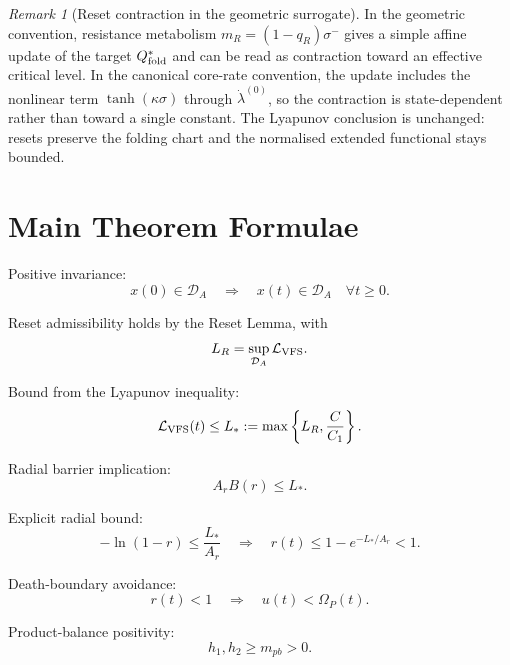 \documentclass[11pt,a4paper]{article}
\newcommand{\DA}{\mathcal D_A}
\newcommand{\LV}{\mathcal L_{\rm VFS}}
\newcommand{\Om}{\Omega_P}
\theoremstyle{plain}
\theoremstyle{definition}
\theoremstyle{remark}
\newtheorem*{remark}{Remark}
\begin{document}
\begin{remark}[Reset contraction in the geometric surrogate]
In the geometric convention, resistance metabolism
$m_R=(1-q_R)\sigma^{-}$ gives a simple affine update of the target
$Q_{\rm fold}^{*}$ and can be read as contraction toward an effective critical
level. In the canonical core-rate convention, the update includes the nonlinear
term $\tanh(\kappa\sigma)$ through $\dot\lambda^{(0)}$, so the contraction is
state-dependent rather than toward a single constant. The Lyapunov conclusion is
unchanged: resets preserve the folding chart and the normalised extended
functional stays bounded.
\end{remark}

\section{Main Theorem Formulae}

Positive invariance:
\begin{equation}
  x(0)\in\DA
  \quad\Longrightarrow\quad
  x(t)\in\DA\quad\forall t\ge0.
\end{equation}

Reset admissibility holds by the Reset Lemma, with
\begin{equation}
  L_R=\sup_{\DA}\LV.
\end{equation}

Bound from the Lyapunov inequality:
\begin{equation}
  \LV(t)\le L_*:=\max\left\{L_R,\frac{C}{C_1}\right\}.
\end{equation}

Radial barrier implication:
\begin{equation}
  A_rB(r)\le L_*.
\end{equation}

Explicit radial bound:
\begin{equation}
  -\ln(1-r)\le\frac{L_*}{A_r}
  \quad\Longrightarrow\quad
  r(t)\le1-e^{-L_*/A_r}<1.
\end{equation}

Death-boundary avoidance:
\begin{equation}
  r(t)<1
  \quad\Longrightarrow\quad
  u(t)<\Om(t).
\end{equation}

Product-balance positivity:
\begin{equation}
  h_1,h_2\ge m_{pb}>0.
\end{equation}
\end{document}
